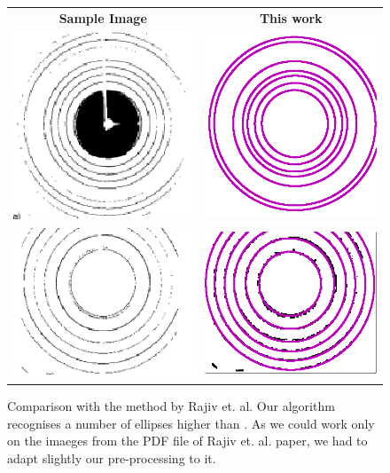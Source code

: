 \documentclass[preprint]{iucr}              %
\begin{document}
\begin{figure}
\centering
\begin{tabular}{cc}
\textbf{Sample Image} & \textbf{This work}
\\
\includegraphics[width=.35\linewidth]{Comparisons/rajiv1.png}
&
\includegraphics[width=.35\linewidth]{Comparisons/rajiv1OurResult.png}
\\
\includegraphics[width=.35\linewidth]{Comparisons/rajiv2.png}
&
\includegraphics[width=.35\linewidth]{Comparisons/rajiv2OurResult.png}
\end{tabular}

\label{fig:compare_rajiv}
\caption {Comparison with the method by Rajiv et. al. Our algorithm recognises a number of ellipses higher than \cite{PDJ:8503397}. As we could work only on the imaeges from the PDF file of Rajiv et. al. paper, we had to adapt slightly our pre-processing to it.}
\end{figure}
\end{document}
